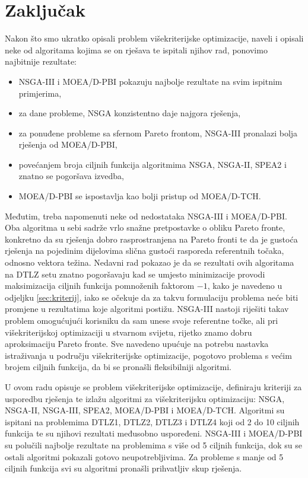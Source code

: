 \documentclass[times, utf8, zavrsni, numeric]{fer}
\begin{document}
\chapter{Zaključak}
Nakon što smo ukratko opisali problem višekriterijske optimizacije, naveli i opisali neke od algoritama kojima se on rješava te ispitali njihov rad, ponovimo najbitnije rezultate:
\begin{itemize}
\item NSGA-III i MOEA/D-PBI pokazuju najbolje rezultate na svim ispitnim primjerima,
\item za dane probleme, NSGA konzistentno daje najgora rješenja,
\item za ponuđene probleme sa sfernom Pareto frontom, NSGA-III pronalazi bolja rješenja od MOEA/D-PBI,
\item povećanjem broja ciljnih funkcija algoritmima NSGA, NSGA-II, SPEA2 i  znatno se pogoršava izvedba,
\item MOEA/D-PBI se ispostavlja kao bolji pristup od MOEA/D-TCH.
\end{itemize}  
Međutim, treba napomenuti neke od nedostataka NSGA-III i MOEA/D-PBI. Oba algoritma u sebi sadrže vrlo snažne pretpostavke o obliku Pareto fronte, konkretno da su rješenja dobro rasprostranjena na Pareto fronti te da je gustoća rješenja na pojedinim dijelovima slična gustoći rasporeda referentnih točaka, odnosno vektora težina. Nedavni rad \citet{problem} pokazao je da se rezultati ovih algoritama na DTLZ setu znatno pogoršavaju kad se umjesto minimizacije provodi maksimizacija ciljnih funkcija pomnoženih faktorom $-1$, kako je navedeno u odjeljku \ref{sec:kriterij}, iako se očekuje da za takvu formulaciju problema neće biti promjene u rezultatima koje algoritmi postižu. NSGA-III nastoji riješiti takav problem omogućujući korisniku da sam unese svoje referentne točke, ali pri višekriterijskoj optimizaciji u stvarnom svijetu, rijetko znamo dobru aproksimaciju Pareto fronte. Sve navedeno upućuje na potrebu nastavka istraživanja u području višekriterijske optimizacije, pogotovo problema s većim brojem ciljnih funkcija, da bi se pronašli fleksibilniji algoritmi.




\begin{sazetak}
U ovom radu opisuje se problem višekriterijske optimizacije, definiraju kriteriji za usporedbu rješenja te izlažu algoritmi za višekriterijsku optimizaciju: NSGA, NSGA-II, NSGA-III, SPEA2, MOEA/D-PBI i MOEA/D-TCH. Algoritmi su ispitani na problemima DTLZ1, DTLZ2, DTLZ3 i DTLZ4 koji od 2 do 10 ciljnih funkcija te su njihovi rezultati međusobno uspoređeni. NSGA-III i MOEA/D-PBI su polučili najbolje rezultate na problemima s više od 5 ciljnih funkcija, dok su se ostali algoritmi pokazali gotovo neupotrebljivima. Za probleme s manje od 5 ciljnih funkcija svi su algoritmi pronašli prihvatljiv skup rješenja.

\end{sazetak}
\end{document}
